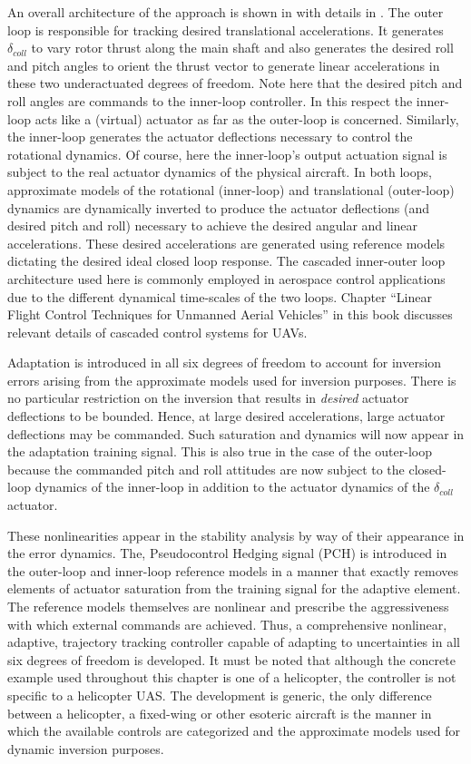 An overall architecture of the approach is shown in  with details in . The outer loop is responsible for tracking desired translational accelerations. It generates $\delta_{coll}$ to vary rotor thrust along the main shaft and also generates the desired roll and pitch angles to orient the thrust vector to generate linear accelerations in these two underactuated degrees of freedom. Note here that the desired pitch and roll angles are commands to the inner-loop controller. In this respect the inner-loop acts like a (virtual) actuator as far as the outer-loop is concerned. Similarly, the inner-loop generates the actuator deflections necessary to control the rotational dynamics. Of course, here the inner-loop's output actuation signal is subject to the real actuator dynamics of the physical aircraft. In both loops, approximate models of the rotational (inner-loop) and translational (outer-loop) dynamics are dynamically inverted to produce the actuator deflections (and desired pitch and roll) necessary to achieve the desired angular and linear accelerations. These desired accelerations are generated using reference models dictating the desired ideal closed loop response. The cascaded inner-outer loop architecture used here is commonly employed in aerospace control applications due to the different dynamical time-scales of the two loops. {\color{red} Chapter ``Linear Flight Control Techniques for Unmanned Aerial Vehicles'' in this book discusses relevant details of cascaded control systems for UAVs.}

Adaptation is introduced in all six degrees of freedom to account for inversion errors arising from the approximate models used for inversion purposes. There is no particular restriction on the inversion that results in \emph{desired} actuator deflections to be bounded. Hence, at large desired accelerations, large actuator deflections may be commanded. Such saturation and dynamics will now appear in the adaptation training signal. This is also true in the case of the outer-loop because the commanded pitch and roll attitudes are now subject to the closed-loop dynamics of the inner-loop in addition to the actuator dynamics of the $\delta_{coll}$ actuator.

These nonlinearities appear in the stability analysis by way of their appearance in the error dynamics.  The, Pseudocontrol Hedging signal (PCH) is introduced in the outer-loop and inner-loop reference models in a manner that exactly removes elements of actuator saturation from the training signal for the adaptive element. The reference models themselves are nonlinear and prescribe the aggressiveness with which external commands are achieved. Thus, a comprehensive nonlinear, adaptive, trajectory tracking controller capable of adapting to uncertainties in all six degrees of freedom is developed. It must be noted that although the concrete example used throughout this chapter is one of a helicopter, the controller is not specific to a helicopter UAS. The development is generic, the only difference between a helicopter, a fixed-wing or other esoteric aircraft is the manner in which the available controls are categorized and the approximate models used for dynamic inversion purposes.

